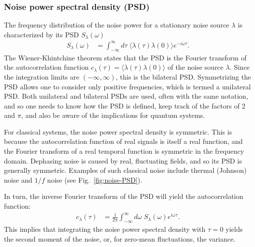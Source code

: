 \documentclass[aip,apr,twocolumn,showpacs,superscriptaddress,groupedaddress,nofootinbib,reprint]{revtex4-1}  %
\begin{document}
\subsubsection{Noise power spectral density (PSD)}
The frequency distribution of the noise power for a stationary noise source $\lambda$ is characterized by its PSD $S_{\lambda}(\omega)$
%
\begin{align}
    \label{eq:PSD_defn}
    S_{\lambda}(\omega) &= \int_{-\infty}^{\infty} d\tau \; \langle \lambda(\tau) \lambda(0) \rangle e^{- i \omega \tau}.
\end{align}
%
The Wiener-Khintchine theorem states that the PSD is the Fourier transform of the autocorrelation function $c_{\lambda}(\tau) = \langle \lambda(\tau) \lambda(0) \rangle$ of the noise source $\lambda$. Since the integration limits are $(-\infty,\infty)$, this is the bilateral PSD. Symmetrizing the PSD allows one to consider only positive frequencies, which is termed a unilateral PSD. Both unilateral and bilateral PSDs are used, often with the same notation, and so one needs to know how the PSD is defined, keep track of the factors of 2 and $\pi$, and also be aware of the implications for quantum systems.

For classical systems, the noise power spectral density is symmetric. This is because the autocorrelation function of real signals is itself a real function, and the Fourier transform of a real temporal function is symmetric in the frequency domain. Dephasing noise is caused by real, fluctuating fields, and so its PSD is generally symmetric. Examples of such classical noise include thermal (Johnson) noise and $1/f$ noise\cite{Johnson1928} (see Fig.~\ref{fig:noise-PSD}).

In turn, the inverse Fourier transform of the PSD will yield the autocorrelation function:
%
\begin{align}
      c_{\lambda}(\tau) &= \frac{1}{2\pi} \int_{-\infty}^{\infty} d\omega \; S_{\lambda}(\omega) e^{ i \omega \tau}. %
\end{align}
%
This implies that integrating the noise power spectral density with $\tau=0$ yields the second moment of the noise, or, for zero-mean fluctuations, the variance.
\end{document}
